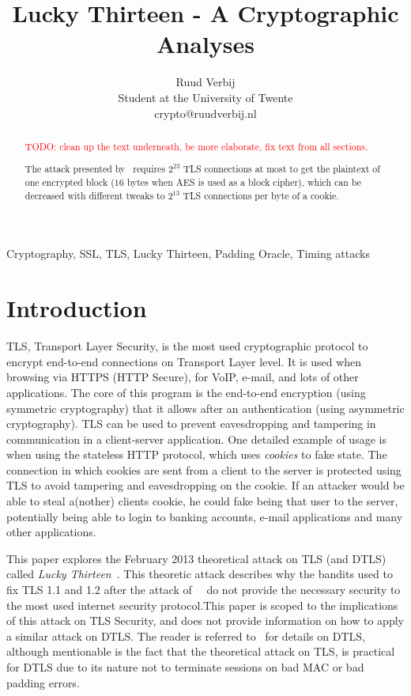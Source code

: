 \documentclass[10pt,conference,a4paper]{IEEEtran}
\title{Lucky Thirteen - A Cryptographic Analyses}
\author{Ruud Verbij \\ Student at the University of Twente \\ crypto@ruudverbij.nl}
\begin{document}
\maketitle



\begin{abstract}
\textcolor{red}{TODO: clean up the text underneath, be more elaborate, fix text from all sections.}

The attack presented by~\citeauthor{alfardan2013lucky} requires $2^{23}$ TLS connections at most to get the plaintext of one encrypted block ($16$ bytes when AES is used as a block cipher), which can be decreased with different tweaks to $2^{13}$ TLS connections per byte of a cookie.
\end{abstract}



\begin{IEEEkeywords}
Cryptography, SSL, TLS, Lucky Thirteen, Padding Oracle, Timing attacks
\end{IEEEkeywords}



\section{Introduction}
\label{sec:intro}
TLS, Transport Layer Security, is the most used cryptographic protocol to encrypt end-to-end connections on Transport Layer level. It is used when browsing via HTTPS (HTTP Secure), for VoIP, e-mail, and lots of other applications. The core of this program is the end-to-end encryption (using symmetric cryptography) that it allows after an authentication (using asymmetric cryptography). TLS can be used to prevent eavesdropping and tampering in communication in a client-server application. One detailed example of usage is when using the stateless HTTP protocol, which uses \textit{cookies} to fake state. The connection in which cookies are sent from a client to the server is protected using TLS to avoid tampering and eavesdropping on the cookie. If an attacker would be able to steal a(nother) clients cookie, he could fake being that user to the server, potentially being able to login to banking accounts, e-mail applications and many other applications.

This paper explores the February 2013 theoretical attack on TLS (and DTLS) called \textit{Lucky Thirteen}~\cite{alfardan2013lucky}. This theoretic attack describes why the bandits used to fix TLS 1.1 and 1.2 after the attack of~\citeauthor{canvel2003password}~\cite{canvel2003password} do not provide the necessary security to the most used internet security protocol.This paper is scoped to the implications of this attack on TLS Security, and does not provide information on how to apply a similar attack on DTLS. The reader is referred to~\cite{alfardan2013lucky} for details on DTLS, although mentionable is the fact that the theoretical attack on TLS, is practical for DTLS due to its nature not to terminate sessions on bad MAC or bad padding errors.
\end{document}
